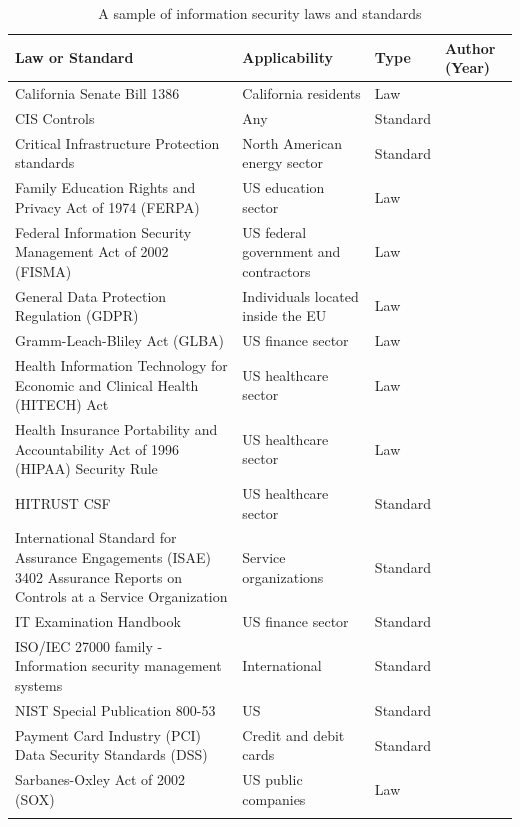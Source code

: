 \documentclass{article}
\begin{document}
\begin{landscape}
\begin{longtable}{p{10cm} | p{4cm} | p{1.6cm} | p{6cm}}
    Law or Standard & Applicability & Type & Author (Year)\\
    \hline
    California Senate Bill 1386 & California residents & Law & \cite{peace_california_2002} \\
    CIS Controls & Any & Standard & \cite{center_for_internet_security_cis_2018} \\
    Critical Infrastructure Protection standards & North American energy sector & Standard & \cite{north_american_electric_reliability_corporation_critical_} \\
    Family Education Rights and Privacy Act of 1974 (FERPA) & US education sector & Law & \cite{buckley_family_1974} \\
    Federal Information Security Management Act of 2002 (FISMA) & US federal government and contractors & Law & \cite{davis_iii_federal_2002} \\
    General Data Protection Regulation (GDPR) & Individuals located inside the EU & Law & \cite{european_parliament_and_council_regulation_2016} \\
    Gramm-Leach-Bliley Act (GLBA) & US finance sector & Law & \cite{gramm_grammleachbliley_1999} \\
    Health Information Technology for Economic and Clinical Health (HITECH) Act & US healthcare sector & Law & \cite{mcmorris_rodgers_health_2009} \\
    Health Insurance Portability and Accountability Act of 1996 (HIPAA) Security Rule & US healthcare sector & Law & \cite{archer_jr._health_1996}\\
    HITRUST CSF & US healthcare sector & Standard & \cite{hitrust_alliance_hitrust_2018} \\
    International Standard for Assurance Engagements (ISAE) 3402 Assurance Reports on Controls at a Service Organization & Service organizations & Standard & \cite{international_federation_of_accountants_international_2011} \\
    IT Examination Handbook & US finance sector & Standard & \cite{federal_financial_institutions_examination_council_ffiec_it_} \\
    ISO/IEC 27000 family - Information security management systems & International & Standard & \cite{international_organization_for_standardization_iso/iec_2013} \\
    NIST Special Publication 800-53 & US & Standard & \cite{national_institute_of_standards_and_technology_nist_2013} \\
    Payment Card Industry (PCI) Data Security Standards (DSS) & Credit and debit cards & Standard & \cite{pci_security_standards_council_payment_2016} \\
    Sarbanes-Oxley Act of 2002 (SOX) & US public companies & Law & \cite{oxley_sarbanesoxley_2002} \\
    \caption{A sample of information security laws and standards}
    \label{table:laws_standards}
\end{longtable}
\end{landscape}
\end{document}
